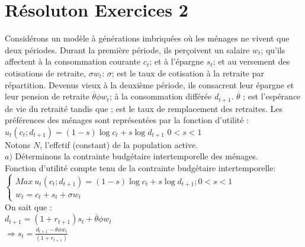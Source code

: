 \documentclass[11pt,twoside,a4paper]{article}
\begin{document}
  \section*{Résoluton Exercices 2}
  
  Considérons un modèle à générations imbriquées où les ménages ne vivent que deux périodes. Durant la première période, ils perçoivent un salaire $w_t$; qu'ils affectent à la  consommation courante $c_t$; et à l'épargne $s_t$; et au versement des cotisations de retraite, $\sigma w_t$: $\sigma$; est le taux de cotisation à la retraite par répartition. Devenus vieux à la deuxième période, ils consacrent leur épargne et leur pension de retraite $\overline{\theta}\phi w_t$; à la consommation différée $d_{t+1}$.
$\overline{\theta}$ ; est l'espérance de vie du retraité tandis que ; est le taux de remplacement
des retraites. Les préférences des ménages sont représentées par la fonction d'utilité :\\
$u_t(c_t; d_{t+1})=(1-s)\log{c_t} + s\log{d_{t+1}}$ \: $0<s<1$
\\
Notons $N$, l'effctif (constant) de la population active.\\

$a)$ Déterminons la contrainte budgétaire intertemporelle des ménages.\\

Fonction d'utilité compte tenu de la contrainte budgétaire intertemporelle:\\

$ \left\{\begin{array}{rl}
 Max \ u_t(c_t; d_{t+1})=  (1-s)\log{c_t} + s\log{d_{t+1}} ; 0<s<1 \\
 
w_t  =  c_t + s_t +  \sigma w_t \end{array}\right. $  \\

On sait que :\\

$d_{t+1}=(1+r_{t+1})s_t+\overline{\theta}\phi w_t$\\

  $
\Rightarrow s_t=\frac{d_{t+1}-\overline{\theta}\phi w_t}{(1+r_{t+1})}$\\

 
\end{document}
